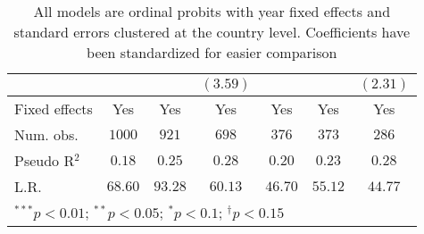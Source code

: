 \begin{table}[h]
\begin{center}
\begin{tabular}{l c c c c c c}
                     &              &                   & $(3.59)$      &                   &                   & $(2.31)$      \\
\hline
Fixed effects        & Yes          & Yes               & Yes           & Yes               & Yes               & Yes           \\
Num. obs.            & $1000$       & $921$             & $698$         & $376$             & $373$             & $286$         \\
Pseudo R$^2$         & $0.18$       & $0.25$            & $0.28$        & $0.20$            & $0.23$            & $0.28$        \\
L.R.                 & $68.60$      & $93.28$           & $60.13$       & $46.70$           & $55.12$           & $44.77$       \\
\hline
\multicolumn{7}{l}{\scriptsize{$^{***}p<0.01$; $^{**}p<0.05$; $^{*}p<0.1$; $^{\dagger}p<0.15$}}
\end{tabular}
\caption{All models are ordinal probits with year fixed effects and standard errors clustered at the country level. Coefficients have been standardized for easier comparison}
\label{table:model}
\end{center}
\end{table}
